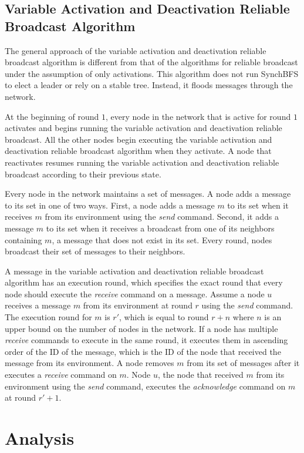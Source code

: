 \documentclass[english]{article}
\begin{document}
  \subsection {Variable Activation and Deactivation Reliable Broadcast Algorithm}

The general approach of the variable activation and deactivation reliable broadcast algorithm is different from that of the algorithms for reliable broadcast under the assumption of only activations. This algorithm does not run SynchBFS to elect a leader or rely on a stable tree. Instead, it floods messages through the network.

At the beginning of round $1$, every node in the network that is active for round $1$ activates and begins running the variable activation and deactivation reliable broadcast. All the other nodes begin executing the variable activation and deactivation reliable broadcast algorithm when they activate. A node that reactivates resumes running the variable activation and deactivation reliable broadcast according to their previous state.

Every node in the network maintains a set of messages. A node adds a message to its set in one of two ways. First, a node adds a message $m$ to its set when it receives $m$ from its environment using the \textit{send} command. Second, it adds a message $m$ to its set when it receives a broadcast from one of its neighbors containing $m$, a message that does not exist in its set. Every round, nodes broadcast their set of messages to their neighbors. 

A message in the variable activation and deactivation reliable broadcast algorithm has an execution round, which specifies the exact round that every node should execute the \textit{receive} command on a message. Assume a node $u$ receives a message $m$ from its environment at round $r$ using the \textit{send} command. The execution round for $m$ is $r'$, which is equal to round $r + n$ where $n$ is an upper bound on the number of nodes in the network. If a node has multiple \textit{receive} commands to execute in the same round, it executes them in ascending order of the ID of the message, which is the ID of the node that received the message from its environment. A node removes $m$ from its set of messages after it executes a \textit{receive} command on $m$. Node $u$, the node that received $m$ from its environment using the \textit{send} command, executes the \textit{acknowledge} command on $m$ at round $r' + 1$.


\section{Analysis}
\end{document}
